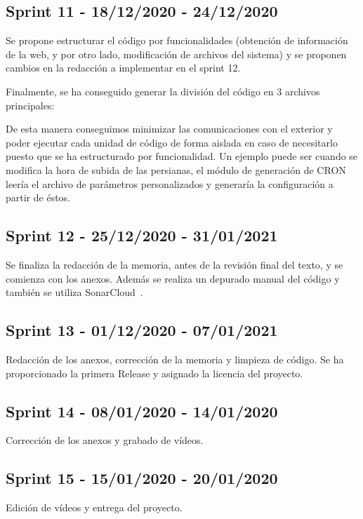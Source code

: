 \subsection{Sprint 11 - 18/12/2020 - 24/12/2020}
Se propone estructurar el código por funcionalidades (obtención de información de la web, y por otro lado, modificación de archivos del sistema) y se proponen cambios en la redacción a implementar en el sprint 12.


Finalmente, se ha conseguido generar la división del código en 3 archivos principales:

De esta manera conseguimos minimizar las comunicaciones con el exterior y poder ejecutar cada unidad de código de forma aislada en caso de necesitarlo puesto que se ha estructurado por funcionalidad. Un ejemplo puede ser cuando se modifica la hora de subida de las persianas, el módulo de generación de CRON leería el archivo de parámetros personalizados y generaría la configuración a partir de éstos.


\subsection{Sprint 12 - 25/12/2020 - 31/01/2021}
Se finaliza la redacción de la memoria, antes de la revisión final del texto, y se comienza con los anexos. Además se realiza un depurado manual del código y también se utiliza SonarCloud~\cite{misc:sonarcloud}.

\subsection{Sprint 13 - 01/12/2020 - 07/01/2021}
Redacción de los anexos, corrección de la memoria y limpieza de código.
Se ha proporcionado la primera Release y asignado la licencia del proyecto.

\subsection{Sprint 14 - 08/01/2020 - 14/01/2020}
Corrección de los anexos y grabado de vídeos.

\subsection{Sprint 15 - 15/01/2020 - 20/01/2020}
Edición de vídeos y entrega del proyecto.





